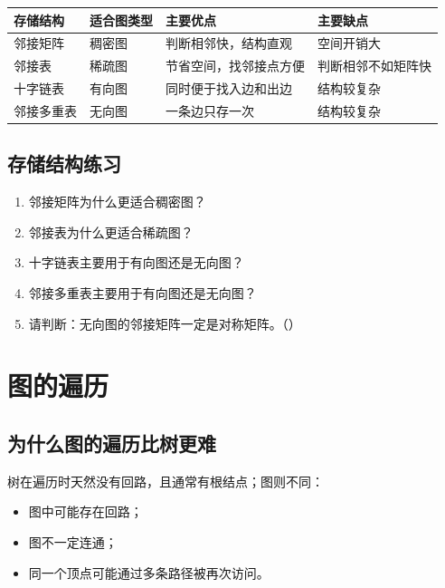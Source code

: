\documentclass{../../note}
\begin{document}
\begin{center}
\begin{tabular}{|>{\centering\arraybackslash}m{2.5cm}|>{\centering\arraybackslash}m{2.5cm}|>{\centering\arraybackslash}m{3.2cm}|>{\centering\arraybackslash}m{3.2cm}|}
\hline
存储结构 & 适合图类型 & 主要优点 & 主要缺点 \\
\hline
邻接矩阵 & 稠密图 & 判断相邻快，结构直观 & 空间开销大 \\
\hline
邻接表 & 稀疏图 & 节省空间，找邻接点方便 & 判断相邻不如矩阵快 \\
\hline
十字链表 & 有向图 & 同时便于找入边和出边 & 结构较复杂 \\
\hline
邻接多重表 & 无向图 & 一条边只存一次 & 结构较复杂 \\
\hline
\end{tabular}
\end{center}

\subsection{存储结构练习}

\begin{enumerate}
  \item 邻接矩阵为什么更适合稠密图？
  \item 邻接表为什么更适合稀疏图？
  \item 十字链表主要用于有向图还是无向图？
  \item 邻接多重表主要用于有向图还是无向图？
  \item 请判断：无向图的邻接矩阵一定是对称矩阵。（\hspace{1cm}）
\end{enumerate}

\section{图的遍历}

\subsection{为什么图的遍历比树更难}

树在遍历时天然没有回路，且通常有根结点；图则不同：

\begin{itemize}
  \item 图中可能存在回路；
  \item 图不一定连通；
  \item 同一个顶点可能通过多条路径被再次访问。
\end{itemize}
\end{document}
